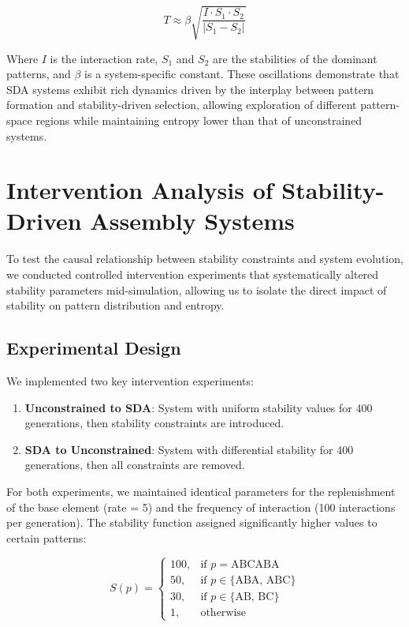 \documentclass[preprint,12pt]{elsarticle}
\begin{document}
\begin{equation}
T \approx \beta \sqrt{\frac{I \cdot S_1 \cdot S_2}{|S_1 - S_2|}}
\end{equation}

Where $I$ is the interaction rate, $S_1$ and $S_2$ are the stabilities of the dominant patterns, and $\beta$ is a system-specific constant. These oscillations demonstrate that SDA systems exhibit rich dynamics driven by the interplay between pattern formation and stability-driven selection, allowing exploration of different pattern-space regions while maintaining entropy lower than that of unconstrained systems.



\section{Intervention Analysis of Stability-Driven Assembly Systems}

To test the causal relationship between stability constraints and system evolution, we conducted controlled intervention experiments that systematically altered stability parameters mid-simulation, allowing us to isolate the direct impact of stability on pattern distribution and entropy.

\subsection{Experimental Design}

We implemented two key intervention experiments:

\begin{enumerate}
    \item \textbf{Unconstrained to SDA}: System with uniform stability values for 400 generations, then stability constraints are introduced.
    
    \item \textbf{SDA to Unconstrained}: System with differential stability for 400 generations, then all constraints are removed.
\end{enumerate}

For both experiments, we maintained identical parameters for the replenishment of the base element (rate = 5) and the frequency of interaction (100 interactions per generation). The stability function assigned significantly higher values to certain patterns:

\begin{equation}
S(p) = 
\begin{cases}
100, & \text{if } p = \text{ABCABA} \\
50, & \text{if } p \in \{\text{ABA, ABC}\} \\
30, & \text{if } p \in \{\text{AB, BC}\} \\
1, & \text{otherwise}
\end{cases}
\end{equation}
\end{document}
